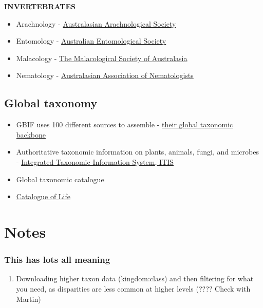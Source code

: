 \documentclass[
  letterpaper,
  DIV=11,
  numbers=noendperiod,
  oneside]{scrreprt}
\providecommand{\tightlist}{%
  \setlength{\itemsep}{0pt}\setlength{\parskip}{0pt}}\usepackage{longtable,booktabs,array}
\begin{document}
\textbf{INVERTEBRATES}

\begin{itemize}
\tightlist
\item
  Arachnology -
  \href{www.australasianarachnologicalsociety.org}{Australasian
  Arachnological Society}\\
\item
  Entomology - \href{https://www.austentsoc.org.au/}{Australian
  Entomological Society}\\
\item
  Malacology - \href{https://www.malsocaus.org/}{The Malacological
  Society of Australasia}\\
\item
  Nematology - \href{https://www.nematologists.org.au/}{Australasian
  Association of Nematologists}
\end{itemize}

\hypertarget{global-taxonomy}{%
\subsection{Global taxonomy}\label{global-taxonomy}}

\begin{itemize}
\item
  GBIF uses 100 different sources to assemble -
  \href{https://www.gbif.org/dataset/d7dddbf4-2cf0-4f39-9b2a-bb099caae36c}{their
  global taxonomic backbone}
\item
  Authoritative taxonomic information on plants, animals, fungi, and
  microbes - \href{https://www.itis.gov/}{Integrated Taxonomic
  Information System, ITIS}
\item
  Global taxonomic catalogue
\item
  \href{https://www.catalogueoflife.org/}{Catalogue of Life}
\end{itemize}

\hypertarget{notes}{%
\section{Notes}\label{notes}}

\hypertarget{this-has-lots-all-meaning}{%
\subsubsection{This has lots all
meaning}\label{this-has-lots-all-meaning}}

\begin{enumerate}
\def\labelenumi{\arabic{enumi}.}
\tightlist
\item
  Downloading higher taxon data (kingdom:class) and then filtering for
  what you need, as disparities are less common at higher levels (????
  Check with Martin)
\end{enumerate}
\end{document}
